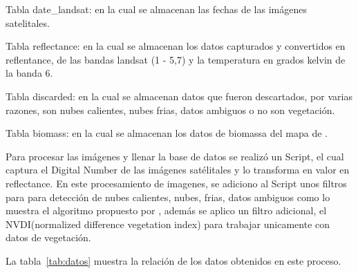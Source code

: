 Tabla date\_landsat: en la cual se almacenan las fechas de las imágenes satelitales.

Tabla reflectance: en la cual se almacenan los datos capturados y convertidos en reflentance,
de las bandas landsat (1 - 5,7) y la temperatura en grados kelvin de la banda 6.

Tabla discarded: en la cual se almacenan datos que fueron descartados, por varias razones,
son nubes calientes, nubes frias, datos ambiguos o no son vegetación.

Tabla biomass: en la cual se almacenan los datos de biomassa del mapa de \cite{baccini2008afirst}.

Para procesar las imágenes y llenar la base de datos se realizó un Script, el cual captura el Digital Number
de las imágenes satélitales y lo transforma en valor en reflectance. En este procesamiento de imagenes, se adiciono al Script unos filtros para para detección de nubes calientes,
nubes, frias, datos ambiguos como lo muestra el algoritmo propuesto por \cite{irish2000landsat}, además se aplico 
un filtro adicional, el NVDI(normalized difference vegetation index) para trabajar unicamente con datos de vegetación.

La tabla~\ref{tab:datos} muestra la relación de los datos obtenidos en este proceso.

\begin{table}
\caption{Datos obtenidos en en el proceso de procesamiento y limpieza  de datos}
\label{tab:datos}
\centering
{}
\end{table}


